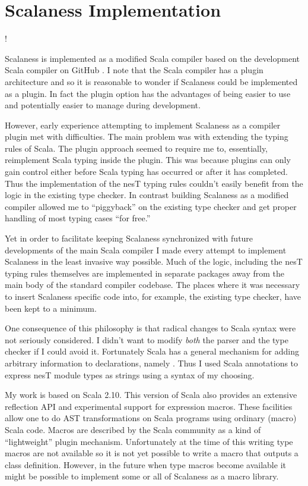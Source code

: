 \chapter{Scalaness Implementation}
\label{chapter-scalaness-implementation}

\lstset{language=scalaness}
\lstMakeShortInline!

Scalaness is implemented as a modified Scala compiler based on the development Scala compiler on
GitHub \cite{XXX}. I note that the Scala compiler has a plugin architecture and so it is
reasonable to wonder if Scalaness could be implemented as a plugin. In fact the plugin option
has the advantages of being easier to use and potentially easier to manage during development.

However, early experience attempting to implement Scalaness as a compiler plugin met with
difficulties. The main problem was with extending the typing rules of Scala. The plugin approach
seemed to require me to, essentially, reimplement Scala typing inside the plugin. This was
because plugins can only gain control either before Scala typing has occurred or after it has
completed. Thus the implementation of the nesT typing rules couldn't easily benefit from the
logic in the existing type checker. In contrast building Scalaness as a modified compiler
allowed me to ``piggyback'' on the existing type checker and get proper handling of most typing
cases ``for free.''

Yet in order to facilitate keeping Scalaness synchronized with future developments of the main
Scala compiler I made every attempt to implement Scalaness in the least invasive way possible.
Much of the logic, including the nesT typing rules themselves are implemented in separate
packages away from the main body of the standard compiler codebase. The places where it was
necessary to insert Scalaness specific code into, for example, the existing type checker, have
been kept to a minimum.

One consequence of this philosophy is that radical changes to Scala syntax were not seriously
considered. I didn't want to modify \emph{both} the parser and the type checker if I could avoid
it. Fortunately Scala has a general mechanism for adding arbitrary information to declarations,
namely . Thus I used Scala annotations to express nesT module types as
strings using a syntax of my choosing.

My work is based on Scala 2.10. This version of Scala also provides an extensive reflection API
and experimental support for expression macros. These facilities allow one to do AST
transformations on Scala programs using ordinary (macro) Scala code. Macros are described by the
Scala community as a kind of ``lightweight'' plugin mechanism. Unfortunately at the time of this
writing type macros are not available so it is not yet possible to write a macro that outputs a
class definition. However, in the future when type macros become available it might be possible
to implement some or all of Scalaness as a macro library.

